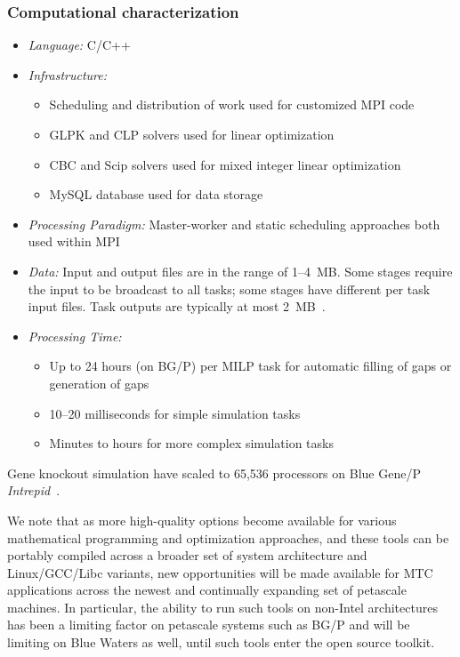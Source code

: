 \documentclass[10pt,letterpaper]{article}
\begin{document}
\subsubsection{Computational characterization}
\begin {itemize}
\item {\em Language:} C/C++
\item {\em Infrastructure:}~\cite{henry-email-10}
    \begin{itemize}
        \item Scheduling and distribution of work used for customized MPI code
        \item GLPK and CLP solvers used for linear optimization
        \item CBC and Scip solvers used for mixed integer linear optimization
        \item MySQL database used for data storage
    \end{itemize}

    \item {\em Processing Paradigm:}
        Master-worker and static scheduling approaches both used within
        MPI
    \item {\em Data:}
        Input and output files are in the range of 1--4~MB. Some
        stages require the input to be broadcast to all tasks; some stages
        have different per task input files.
        Task outputs are typically at most 2~MB~\cite{henry-09, henry-email-10}.
\item {\em Processing Time:}~\cite{henry-09}
    \begin{itemize}
    \item Up to 24 hours (on BG/P) per MILP task for automatic filling of gaps
            or generation of gaps
    \item 10--20 milliseconds for simple simulation tasks
    \item Minutes to hours for more complex simulation tasks
    \end{itemize}
\end{itemize}

Gene knockout simulation have scaled to 65,536 processors on Blue Gene/P
        {\em Intrepid}~\cite{henry-09}.

We note that as more high-quality options become available for various mathematical programming and optimization approaches, and these tools can be portably compiled across a broader set of system architecture and Linux/GCC/Libc variants, new opportunities will be made available for MTC applications across the newest and continually expanding set of petascale machines. In particular, the ability to run such tools on non-Intel architectures has been a limiting factor on petascale systems such as BG/P and will be limiting on Blue Waters as well, until such tools enter the open source toolkit.
 
\end{document}
